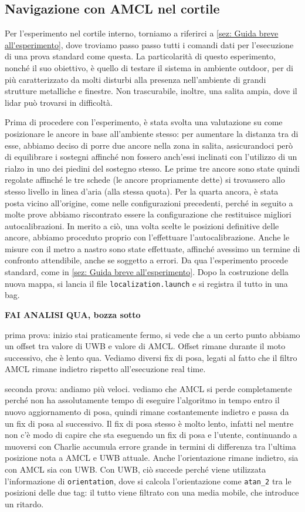 \subsection{Navigazione con AMCL nel cortile}
Per l'esperimento nel cortile interno, torniamo a riferirci a \ref{sez: Guida breve all'esperimento}, dove troviamo passo passo tutti i comandi dati per 
l'esecuzione di una prova standard come questa.
La particolarità di questo esperimento, nonché il suo obiettivo, è quello di testare il sistema in ambiente outdoor, per di più caratterizzato da molti disturbi 
alla presenza nell'ambiente di grandi strutture metalliche e finestre. Non trascurabile, inoltre, una salita ampia, dove il lidar può trovarsi in difficoltà.

Prima di procedere con l'esperimento, è stata svolta una valutazione su come posizionare le ancore in base all'ambiente stesso: per aumentare la distanza tra di 
esse, abbiamo deciso di porre due ancore nella zona in salita, assicurandoci però di equilibrare i sostegni affinché non fossero anch'essi inclinati con l'utilizzo 
di un rialzo in uno dei piedini del sostegno stesso. Le prime tre ancore sono state quindi regolate affinché le tre schede (le ancore propriamente dette) si 
trovassero allo stesso livello in linea d'aria (alla stessa quota). Per la quarta ancora, è stata posta vicino all'origine, come nelle configurazioni precedenti, 
perché in seguito a molte prove abbiamo riscontrato essere la configurazione che restituisce migliori autocalibrazioni. In merito a ciò, una volta scelte le 
posizioni definitive delle ancore, abbiamo proceduto proprio con l'effettuare l'autocalibrazione. Anche le misure con il metro a nastro sono state effettuate, 
affinché avessimo un termine di confronto attendibile, anche se soggetto a errori. Da qua l'esperimento procede standard, come in \ref{sez: Guida breve all'esperimento}. 
Dopo la costruzione della nuova mappa, si lancia il file \verb|localization.launch| e si registra il tutto in una bag.

\textbf{FAI ANALISI QUA, bozza sotto}


prima prova: inizio stai praticamente fermo, si vede che a un certo punto abbiamo un offset tra valore di UWB e valore di AMCL. Offset rimane durante il moto successivo, che 
è lento qua. Vediamo diversi fix di posa, legati al fatto che il filtro AMCL rimane indietro rispetto all'esecuzione real time. 

seconda prova: andiamo più veloci. vediamo che AMCL si perde completamente perché non ha assolutamente tempo di eseguire l'algoritmo in tempo entro il nuovo aggiornamento di 
posa, quindi rimane costantemente indietro e passa da un fix di posa al successivo. Il fix di posa stesso è molto lento, infatti nel mentre non c'è modo di capire
che sta eseguendo un fix di posa e l'utente, continuando a muoversi con Charlie accumula errore grande in termini di differenza tra l'ultima posizione nota a AMCL e UWB attuale.
Anche l'orientazione rimane indietro, sia con AMCL sia con UWB. Con UWB, ciò succede perché viene utilizzata l'informazione di \verb|orientation|, dove si calcola l'orientazione come \verb|atan_2| tra le posizioni delle due tag: il tutto viene filtrato con una media mobile, che introduce un ritardo.

